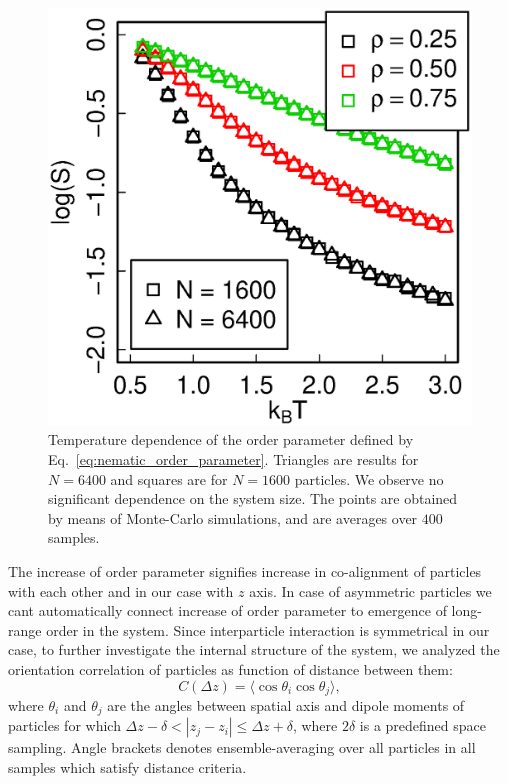 \begin{figure}[t]
\centering
	\includegraphics[width=0.7\columnwidth]{Images/op_eq_log}
	\caption{Temperature dependence of the order parameter defined by Eq.~\eqref{eq:nematic_order_parameter}. Triangles are results for $N = 6400$ and squares are for $N = 1600$ particles. We observe no significant dependence on the system size. The points are obtained by means of Monte-Carlo simulations, and are averages over $400$ samples.}
	\label{fig:op_kbt}
\end{figure}

The increase of order parameter signifies increase in co-alignment of particles with each other and in our case with $z$ axis. In case of asymmetric particles we cant automatically connect increase of order parameter to emergence of long-range order in the system. Since interparticle interaction is symmetrical in our case, to further investigate the internal structure of the system, we analyzed the orientation correlation of particles as function of distance between them:
\begin{equation}
\label{eq:distance_correlation}
	C(\Delta z) = \langle\cos \theta_i \cos \theta_j\rangle
	,
\end{equation}
where $\theta_i$ and $\theta_j$ are the angles between spatial axis and dipole moments of particles for which $\Delta z - \delta < |z_j - z_i| \leq \Delta z + \delta$, where $2\delta$ is a predefined space sampling. Angle brackets denotes ensemble-averaging over all particles in all samples which satisfy distance criteria.

